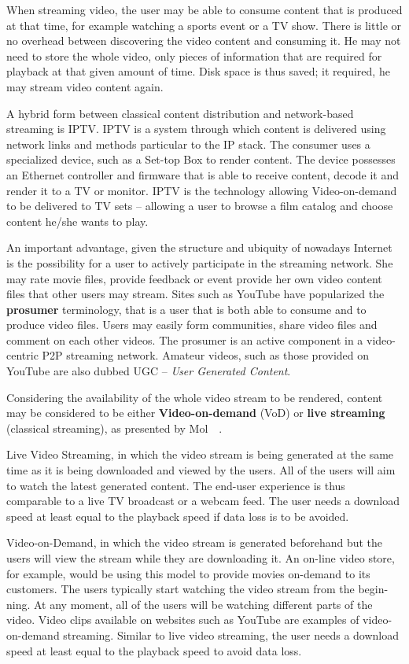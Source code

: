 When streaming video, the user may be able to consume content that is produced
at that time, for example watching a sports event or a TV show. There is
little or no overhead between discovering the video content and consuming it.
He may not need to store the whole video, only pieces of information that are
required for playback at that given amount of time. Disk space is thus saved;
it required, he may stream video content again.

A hybrid form between classical content distribution and network-based
streaming is IPTV. IPTV is a system through which content is delivered using
network links and methods particular to the IP stack. The consumer uses a
specialized device, such as a Set-top Box to render content. The device
possesses an Ethernet controller and firmware that is able to receive content,
decode it and render it to a TV or monitor. IPTV is the technology allowing
Video-on-demand to be delivered to TV sets -- allowing a user to browse a film
catalog and choose content he/she wants to play.

An important advantage, given the structure and ubiquity of nowadays Internet
is the possibility for a user to actively participate in the streaming
network. She may rate movie files, provide feedback or event provide her own
video content files that other users may stream. Sites such as YouTube have
popularized the \textbf{prosumer} terminology, that is a user that is both
able to consume and to produce video files. Users may easily form communities,
share video files and comment on each other videos. The prosumer is an active
component in a video-centric P2P streaming network. Amateur videos, such as
those provided on YouTube are also dubbed UGC -- \textit{User Generated
Content}.

Considering the availability of the whole video stream to be rendered, content
may be considered to be either \textbf{Video-on-demand} (VoD) or \textbf{live
streaming} (classical streaming), as presented by
Mol~\cite{give-to-get}~\cite{design-p2p-live}.

Live Video Streaming, in which the video stream is being generated at the same
time as it is being downloaded and viewed by the users. All of the users will
aim to watch the latest generated content. The end-user experience is thus
comparable to a live TV broadcast or a webcam feed. The user needs a download
speed at least equal to the playback speed if data loss is to be avoided.

Video-on-Demand, in which the video stream is generated beforehand but the
users will view the stream while they are downloading it. An on-line video
store, for example, would be using this model to provide movies on-demand to
its customers. The users typically start watching the video stream from the
begin- ning. At any moment, all of the users will be watching different parts
of the video. Video clips available on websites such as YouTube are examples
of video-on-demand streaming. Similar to live video streaming, the user needs
a download speed at least equal to the playback speed to avoid data loss.

